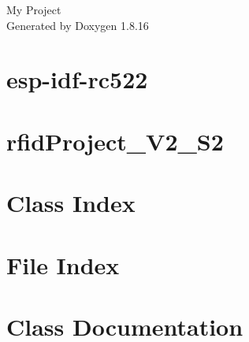 \let\mypdfximage\pdfximage\def\pdfximage{\immediate\mypdfximage}\documentclass[twoside]{book}
\newcommand{\+}{\discretionary{\mbox{\scriptsize$\hookleftarrow$}}{}{}}
\newcommand{\clearemptydoublepage}{%
  \newpage{\pagestyle{empty}\cleardoublepage}%
}
\begin{document}
\hypersetup{pageanchor=false,
             bookmarksnumbered=true,
             pdfencoding=unicode
            }
\begin{titlepage}
\vspace*{7cm}
\begin{center}%
{\Large My Project }\\
\vspace*{1cm}
{\large Generated by Doxygen 1.8.16}\\
\end{center}
\end{titlepage}
\clearemptydoublepage
{}
\tableofcontents
\clearemptydoublepage
{}
\hypersetup{pageanchor=true}

\chapter{esp-\/idf-\/rc522}
\label{md__home_lance_eclipse-workspace_rfidProject_V2_S2_components_Drivers_esp-idf-rc522_README}

\chapter{rfid\+Project\+\_\+\+V2\+\_\+\+S2}
\label{md__home_lance_eclipse-workspace_rfidProject_V2_S2_README}

\chapter{Class Index}

\chapter{File Index}

\chapter{Class Documentation}



















\end{document}
